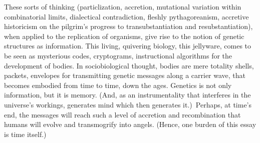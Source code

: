 These sorts of thinking (particlization, accretion, mutational variation within combinatorial limits, dialectical contradiction, fleshly pythagoreanism, accretive historicism on the pilgrim's progress to transubstantiation and resubstantiation), when applied to the replication of organisms, give rise to the notion of genetic structures as information. This living, quivering biology, this jellyware, comes to be seen as mysterious codes, cryptograms, instructional algorithms for the development of bodies. In sociobiological thought, bodies are mere totality shells, packets, envelopes for transmitting genetic messages along a carrier wave, that becomes embodied from time to time, down the ages. Genetics is not only information, but it is memory. (And, as an instrumentality that interferes in the universe's workings, generates mind which then generates it.)\ Perhaps, at time's end, the messages will reach such a level of accretion and recombination that humans will evolve and transmogrify into angels. (Hence, one burden of this essay is time itself.)
